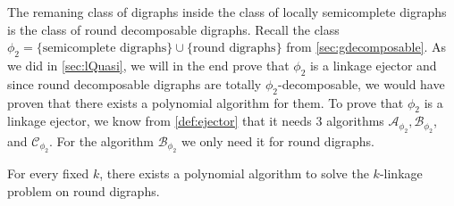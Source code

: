 The remaning class of digraphs inside the class of locally semicomplete digraphs is the class of round decomposable digraphs. 
Recall the class $\phi_2=\lbrace\text{semicomplete digraphs}\rbrace\cup\lbrace\text{round digraphs}\rbrace$ from \autoref{sec:gdecomposable}.
As we did in \autoref{sec:lQuasi}, we will in the end prove that $\phi_2$ is a linkage ejector and since round decomposable digraphs are totally $\phi_2$-decomposable, we would have proven that there exists a polynomial algorithm for them.
To prove that $\phi_2$ is a linkage ejector, we know from \autoref{def:ejector} that it needs 3 algorithms $\mathcal{A}_{\phi_2},\mathcal{B}_{\phi_2}$, and $\mathcal{C}_{\phi_2}$. For the algorithm $\mathcal{B}_{\phi_2}$ we only need it for round digraphs.
\begin{thm}
    For every fixed $k$, there exists a polynomial algorithm to solve the $k$-linkage problem on round digraphs.
    \label{thm:roundklink}
\end{thm}
